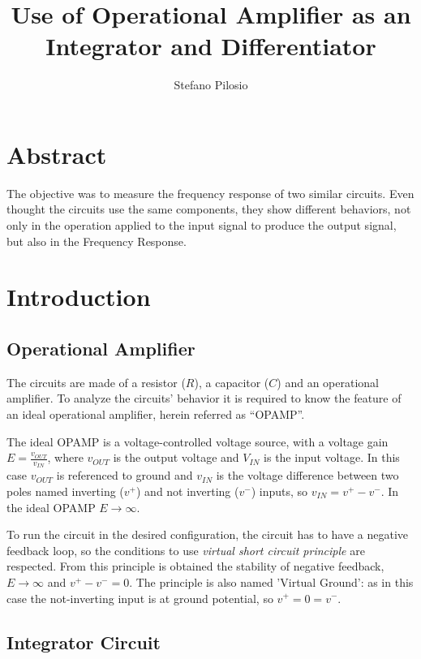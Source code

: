 \documentclass[a4paper, twocolumn]{article}
\begin{document}
\title{Use of Operational Amplifier as  an Integrator and Differentiator}
\author{Stefano Pilosio}

\maketitle


\section{Abstract}
The objective was to measure the frequency response of two similar circuits. Even thought the circuits use the same components, they show different behaviors, not only in the operation applied to the input signal to produce the output signal, but also in the Frequency Response.

\section{Introduction}

\subsection{Operational Amplifier} 

The circuits are made of a resistor ($R$), a capacitor ($C$) and an operational amplifier. To analyze the circuits' behavior it is required to know the feature of an ideal operational amplifier, herein referred as ``OPAMP''.

The ideal OPAMP is a voltage-controlled voltage source, with a voltage gain $E = \frac{v_{OUT}}{v_{IN}}$, where $v_{OUT}$ is the output voltage and $V_{IN}$ is the input voltage. In this case $v_{OUT}$ is referenced to ground and $v_{IN}$ is the voltage difference between two poles named  inverting ($v^+$) and not inverting ($v^-$) inputs, so $v_{IN}=v^+ -v^-$. In the ideal OPAMP $E\to\infty$.

To run the circuit in the desired configuration, the circuit has to have a negative feedback loop, so the conditions to use \emph{virtual short circuit principle} are respected. From this principle is obtained the stability of negative feedback, $E\to\infty$ and $v^+-v^-=0$. The principle is also named 'Virtual Ground': as in this case the not-inverting input is at ground potential, so $v^+=0=v^-$.

\subsection{Integrator Circuit}
\label{sec:integr}
\end{document}
